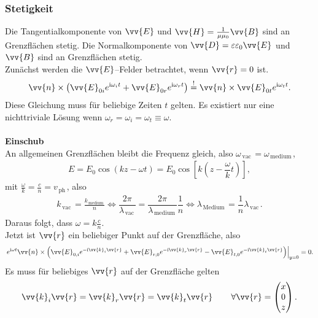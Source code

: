 \documentclass[a4paper,12pt]{article}
\numberwithin{equation}{section}
\begin{document}
\subsubsection{Stetigkeit}
Die Tangentialkomponente von $\vv{E}$ und $\vv{H}=\tfrac{1}{\mu \mu _0}\vv{B}$ sind an Grenzflächen stetig. Die Normalkomponente von $\vv{D}=\varepsilon \varepsilon _0\vv{E}$ und $\vv{B}$ sind an Grenzflächen stetig.\\\indent
Zunächst werden die $\vv{E}$--Felder betrachtet, wenn $\vv{r}=0$ ist.
\begin{align} 
        \vv{n}\times \left(\vv{E}_{0i}e^{\text{i}\omega _it}+\vv{E}_{0r}e^{\text{i}\omega _rt}\right)\stackrel{!}{=}\vv{n}\times \vv{E}_{0t}e^{\text{i}\omega _tt}
.\end{align} 
Diese Gleichung muss für beliebige Zeiten $t$ gelten. Es existiert nur eine nichttriviale Lösung wenn $\omega _r=\omega _i=\omega _t\equiv \omega $.
\\\hfill\\\textbf{Einschub}\\ 
An allgemeinen Grenzflächen bleibt die Frequenz gleich, also $\omega _{\,\text{vac}\,}=\omega _{\,\text{medium}\,}$,
\begin{align} 
        E=E_0\cos \left(kz-\omega t\right)=E_0\cos \left[k\left(z-\dfrac{\omega }{k}t\right)\right]
,\end{align} 
mit $\tfrac{\omega }{k}=\tfrac{c}{n}=v_{\,\text{ph}\,}$, also 
\begin{align} 
k_{\,\text{vac}\,}=\tfrac{k_{\,\text{medium}\,}}{n}\Leftrightarrow \dfrac{2\pi }{\lambda _{\,\text{vac}\,}}=\dfrac{2\pi }{\lambda _{\,\text{medium}\,}}\dfrac{1}{n}\Leftrightarrow \lambda _{\,\text{Medium}\,}=\dfrac{1}{n}\lambda _{\,\text{vac}\,}
.\end{align} 
Daraus folgt, dass $\omega =k\tfrac{c}{n}$.\\\indent
Jetzt ist $\vv{r}$ ein beliebiger Punkt auf der Grenzfläche, also
\begin{align} 
        \left.e^{\text{i}\omega t}\vv{n}\times \left(\vv{E}_{0,i}e^{-\text{i}\vv{k}_i\vv{r}}+\vv{E}_{r,0}e^{-\text{i}\vv{k}_r\vv{r}}-\vv{E}_{t,0}e^{-\text{i}\vv{k}_t\vv{r}}\right)\right|_{y=0}=0
.\end{align} 
Es muss für beliebiges $\vv{r}$ auf der Grenzfläche gelten
\begin{align} 
        \vv{k}_i\vv{r}=\vv{k}_r\vv{r}=\vv{k}_t\vv{r}\qquad \,\forall \vv{r}=\begin{pmatrix}
                x\\0\\z
        \end{pmatrix}
.\end{align} 
\end{document}
